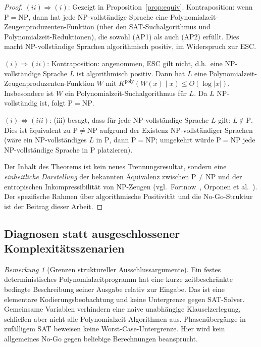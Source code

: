 \documentclass[aps,prd,twocolumn,superscriptaddress,nofootinbib]{revtex4-2}
\theoremstyle{definition}
\theoremstyle{remark}
\newtheorem{remark}[theorem]{Bemerkung}
\DeclareMathOperator{\poly}{poly}
\newcommand{\NP}{\mathrm{NP}}
\newcommand{\PP}{\mathrm{P}}
\begin{document}
\begin{proof}
$(ii) \Rightarrow (i)$: Gezeigt in Proposition~\ref{prop:equiv}. Kontraposition: wenn $\PP = \NP$, dann hat jede NP-vollständige Sprache eine Polynomialzeit-Zeugenproduzenten-Funktion (über den SAT-Suchalgorithmus und Polynomialzeit-Reduktionen), die sowohl (AP1) als auch (AP2) erfüllt. Dies macht NP-vollständige Sprachen algorithmisch positiv, im Widerspruch zur ESC.

$(i) \Rightarrow (ii)$: Kontraposition: angenommen, ESC gilt nicht, d.h.\ eine NP-vollständige Sprache $L$ ist algorithmisch positiv. Dann hat $L$ eine Polynomialzeit-Zeugenproduzenten-Funktion $W$ mit $K^{\poly}(W(x) \mid x) \leq O(\log|x|)$. Insbesondere ist $W$ ein Polynomialzeit-Suchalgorithmus für $L$. Da $L$ NP-vollständig ist, folgt $\PP = \NP$.

$(i) \Leftrightarrow (iii)$: (iii) besagt, dass für jede NP-vollständige Sprache $L$ gilt: $L \notin \PP$. Dies ist äquivalent zu $\PP \neq \NP$ aufgrund der Existenz NP-vollständiger Sprachen (wäre ein NP-vollständiges $L$ in $\PP$, dann $\PP = \NP$; umgekehrt würde $\PP = \NP$ jede NP-vollständige Sprache in $\PP$ platzieren).

Der Inhalt des Theorems ist kein neues Trennungsresultat, sondern eine \textit{einheitliche Darstellung} der bekannten Äquivalenz zwischen $\PP \neq \NP$ und der entropischen Inkompressibilität von NP-Zeugen (vgl.\ Fortnow~\cite{Fortnow2000}, Orponen et al.~\cite{OrponenKoSchoeningWatanabe1994}). Der spezifische Rahmen über algorithmische Positivität und die No-Go-Struktur ist der Beitrag dieser Arbeit.
\end{proof}

\subsection{Diagnosen statt ausgeschlossener Komplexitätsszenarien}
\begin{remark}[Grenzen struktureller Ausschlussargumente]
\label{prop:excluded}
Ein festes deterministisches Polynomialzeitprogramm
hat eine kurze zeitbeschränkte bedingte Beschreibung
seiner Ausgabe relativ zur Eingabe. Das ist eine
elementare Kodierungsbeobachtung und keine
Untergrenze gegen SAT-Solver. Gemeinsame Variablen
verhindern eine naive unabhängige Klauselzerlegung,
schließen aber nicht alle Polynomialzeit-Algorithmen aus.
Phasenübergänge in zufälligem SAT beweisen keine
Worst-Case-Untergrenze. Hier wird kein allgemeines
No-Go gegen beliebige Berechnungen beansprucht.
\end{remark}
\end{document}
